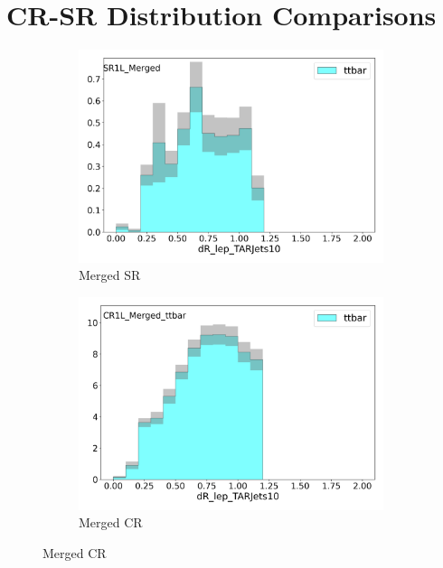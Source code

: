 \section{CR-SR Distribution Comparisons}
\label{section:CRSR}

\begin{figure}[htbp]
  \centering

    \begin{subfigure}{0.49\textwidth}
    \includegraphics[width = 0.98\textwidth]{Figures/4/CRSR/SR1L_Merged/dR_lep_TARJets10.png}
    \caption{Merged SR \drTARl}
    \end{subfigure}
    \begin{subfigure}{0.49\textwidth}
    \includegraphics[width = 0.98\textwidth]{Figures/4/CRSR/CR1L_Merged_ttbar/dR_lep_TARJets10.png}
    \caption{Merged CR \drTARl}
    \end{subfigure}

\end{figure}
